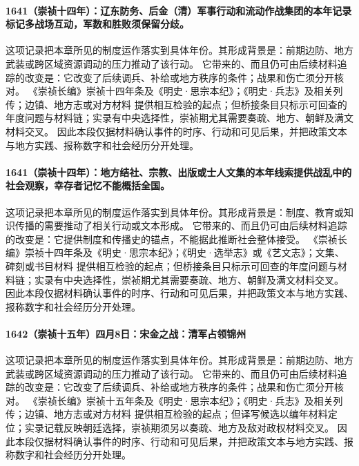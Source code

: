 \paragraph{1641（崇祯十四年）：辽东防务、后金（清）军事行动和流动作战集团的本年记录标记多战场互动，军数和胜败须保留分歧。} 这项记录把本章所见的制度运作落实到具体年份。其形成背景是：前期边防、地方武装或跨区域资源调动的压力推动了该行动。 它带来的、而且仍可由后续材料追踪的改变是：它改变了后续调兵、补给或地方秩序的条件；战果和伤亡须分开核对。 《崇祯长编》崇祯十四年条及《明史·思宗本纪》；《明史·兵志》及相关列传；边镇、地方志或对方材料 提供相互检验的起点；但桥接条目只标示可回查的年度问题与材料链；实录有中央选择性，崇祯期尤其需要奏疏、地方、朝鲜及满文材料交叉。 因此本段仅据材料确认事件的时序、行动和可见后果，并把政策文本与地方实践、报称数字和社会经历分开处理。

\paragraph{1641（崇祯十四年）：地方结社、宗教、出版或士人文集的本年线索提供战乱中的社会观察，幸存者记忆不能概括全国。} 这项记录把本章所见的制度运作落实到具体年份。其形成背景是：制度、教育或知识传播的需要推动了相关行动或文本形成。 它带来的、而且仍可由后续材料追踪的改变是：它提供制度和传播史的锚点，不能据此推断社会整体接受。 《崇祯长编》崇祯十四年条及《明史·思宗本纪》；《明史·选举志》或《艺文志》；文集、碑刻或书目材料 提供相互检验的起点；但桥接条目只标示可回查的年度问题与材料链；实录有中央选择性，崇祯期尤其需要奏疏、地方、朝鲜及满文材料交叉。 因此本段仅据材料确认事件的时序、行动和可见后果，并把政策文本与地方实践、报称数字和社会经历分开处理。

\paragraph{1642（崇祯十五年）四月8日：宋金之战：清军占领锦州} 这项记录把本章所见的制度运作落实到具体年份。其形成背景是：前期边防、地方武装或跨区域资源调动的压力推动了该行动。 它带来的、而且仍可由后续材料追踪的改变是：它改变了后续调兵、补给或地方秩序的条件；战果和伤亡须分开核对。 《崇祯长编》崇祯十五年条及《明史·思宗本纪》；《明史·兵志》及相关列传；边镇、地方志或对方材料 提供相互检验的起点；但译写候选以编年材料定位；实录记载反映朝廷选择，崇祯期须另以奏疏、地方及敌对政权材料交叉。 因此本段仅据材料确认事件的时序、行动和可见后果，并把政策文本与地方实践、报称数字和社会经历分开处理。


